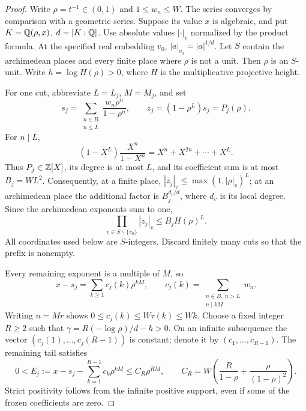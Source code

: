 \documentclass[11pt]{article}
\begin{document}
\begin{proof}
Write $\rho=t^{-1}\in(0,1)$ and $1\le w_n\le W$. The series converges by
comparison with a geometric series. Suppose its value $x$ is algebraic,
and put $K=\mathbb{Q}(\rho,x)$, $d=[K:\mathbb{Q}]$. Use absolute values $|\cdot|_v$
normalized by the product formula. At the specified real embedding $v_0$,
$|a|_{v_0}=|a|^{1/d}$. Let $S$ contain the archimedean places and every finite
place where $\rho$ is not a unit. Then $\rho$ is an $S$-unit. Write
$h=\log H(\rho)>0$, where $H$ is the multiplicative projective height.

For one cut, abbreviate $L=L_j$, $M=M_j$, and set
\[
 s_j=\sum_{\substack{n\in B\\n\le L}}
       \frac{w_n\rho^n}{1-\rho^n},
 \qquad z_j=(1-\rho^L)s_j=P_j(\rho).
\]
For $n\mid L$,
\[
 (1-X^L)\frac{X^n}{1-X^n}=X^n+X^{2n}+\cdots+X^L.
\]
Thus $P_j\in\mathbb{Z}[X]$, its degree is at most $L$, and its coefficient sum is
at most $B_j=WL^2$. Consequently, at a finite place,
$|z_j|_v\le\max(1,|\rho|_v)^L$; at an archimedean place the additional
factor is $B_j^{d_v/d}$, where $d_v$ is its local degree. Since the
archimedean exponents sum to one,
\begin{equation}\label{eq:cuts-conjugates}
 \prod_{v\in S\smallsetminus\{v_0\}}|z_j|_v\le B_j H(\rho)^L.
\end{equation}
All coordinates used below are $S$-integers. Discard finitely many cuts
so that the prefix is nonempty.

Every remaining exponent is a multiple of $M$, so
\[
 x-s_j=\sum_{k\ge1}c_j(k)\rho^{kM},\qquad
 c_j(k)=\sum_{\substack{n\in B,\ n>L\\ n\mid kM}}w_n.
\]
Writing $n=Mr$ shows $0\le c_j(k)\le W\tau(k)\le Wk$.
Choose a fixed integer $R\ge2$ such that
$\gamma=R(-\log\rho)/d-h>0$. On an infinite subsequence the vector
$(c_j(1),\ldots,c_j(R-1))$ is constant; denote it by $(c_1,\ldots,c_{R-1})$.
The remaining tail satisfies
\[
 0<E_j:=x-s_j-\sum_{k=1}^{R-1}c_k\rho^{kM}
 \le C_R\rho^{RM},\qquad
 C_R=W\left(\frac{R}{1-\rho}+\frac{\rho}{(1-\rho)^2}\right).
\]
Strict positivity follows from the infinite positive support, even if
some of the frozen coefficients are zero.


\end{proof}
\end{document}
